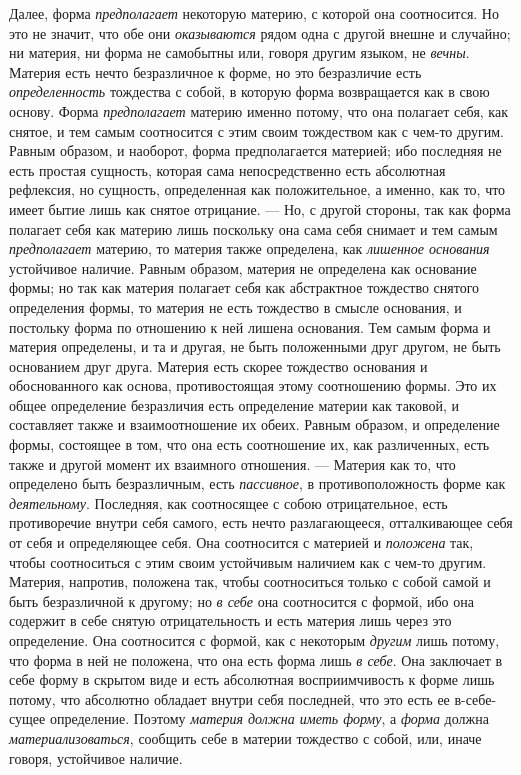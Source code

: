 Далее, форма {\em предполагает} некоторую материю, с
которой она соотносится. Но это не значит, что обе они
{\em оказываются} рядом одна с другой внешне и
случайно; ни материя, ни форма не самобытны или, говоря другим языком, не
{\em вечны}. Материя есть нечто безразличное к форме,
но это безразличие есть {\em определенность} тождества
с собой, в которую форма возвращается как в свою основу. Форма
{\em предполагает} материю именно потому, что она
полагает себя, как снятое, и тем самым соотносится с этим своим тождеством
как с чем-то другим. Равным образом, и наоборот, форма предполагается
материей; ибо последняя не есть простая сущность, которая сама
непосредственно есть абсолютная рефлексия, но сущность, определенная как
положительное, а именно, как то, что имеет бытие лишь как снятое отрицание.
— Но, с другой стороны, так как форма полагает себя как материю лишь
поскольку она сама себя снимает и тем самым
{\em предполагает} материю, то материя также
определена, как {\em лишенное основания} устойчивое
наличие. Равным образом, материя не определена как основание формы; но так
как материя полагает себя как абстрактное тождество снятого определения
формы, то материя не есть тождество в смысле основания, и постольку форма
по отношению к ней лишена основания. Тем самым форма и материя определены,
и та и другая, не быть положенными друг другом, не быть основанием друг
друга. Материя есть скорее тождество основания и обоснованного как основа,
противостоящая этому соотношению формы. Это их общее определение
безразличия есть определение материи как таковой, и составляет также и
взаимоотношение их обеих. Равным образом, и определение формы, состоящее в
том, что она есть соотношение их, как различенных, есть также и другой
момент их взаимного отношения. — Материя как то, что определено быть
безразличным, есть {\em пассивное}, в противоположность
форме как {\em деятельному}. Последняя, как соотносящее
с собою отрицательное, есть противоречие внутри себя самого, есть нечто
разлагающееся, отталкивающее себя от себя и определяющее себя. Она
соотносится с материей и {\em положена} так, чтобы
соотноситься с этим своим устойчивым наличием как с чем-то другим. Материя,
напротив, положена так, чтобы соотноситься только с собой самой и быть
безразличной к другому; но {\em в себе} она соотносится
с формой, ибо она содержит в себе снятую отрицательность и есть материя
лишь через это определение. Она соотносится с формой, как с некоторым
{\em другим} лишь потому, что форма в ней не положена,
что она есть форма лишь {\em в себе}. Она заключает в
себе форму в скрытом виде и есть абсолютная восприимчивость к форме лишь
потому, что абсолютно обладает внутри себя последней, что это есть ее
в-себе-сущее определение. Поэтому {\em материя должна
иметь форму}, а {\em форма} должна
{\em материализоваться}, сообщить себе в материи
тождество с собой, или, иначе говоря, устойчивое наличие.

